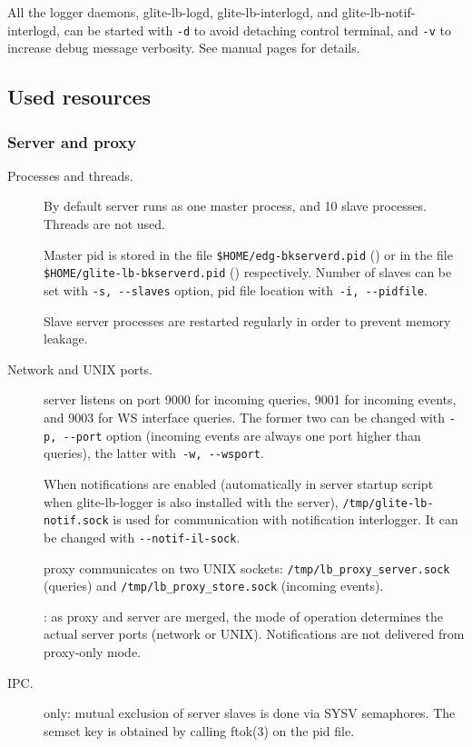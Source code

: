All the logger daemons, \ie glite-lb-logd, glite-lb-interlogd, and
glite-lb-notif-interlogd, can be started with \verb'-d' 
to avoid detaching control terminal, and \verb'-v' to increase 
debug message verbosity.
See manual pages for details.

\subsection{Used resources}
\label{run:resources}

\subsubsection{Server and proxy}

\begin{description}
\item[Processes and threads.]
By default \LB server runs as one master process,
and 10 slave processes.
Threads are not used.

Master pid is stored in the file \verb'$HOME/edg-bkserverd.pid' ()
or in the file \verb'$HOME/glite-lb-bkserverd.pid' () respectively.
Number of slaves can be set with \verb'-s, --slaves' option,
pid file location with~\verb'-i, --pidfile'.

Slave server processes are restarted regularly in order to prevent
memory leakage.

\item[Network and UNIX ports.]
\LB server listens on port 9000 for incoming queries,
9001 for incoming events, and 9003 for WS interface queries.
The former two can be changed with \verb'-p, --port' option
(incoming events are always one port higher than queries), 
the latter with~\verb'-w, --wsport'.

When \LB notifications are enabled (automatically in server startup script when 
glite-lb-logger is also installed with the server), 
\verb'/tmp/glite-lb-notif.sock' is used for communication with notification interlogger.
It can be changed with \verb'--notif-il-sock'.

\LB proxy communicates on two UNIX sockets:
\verb'/tmp/lb_proxy_server.sock' (queries) and 
\verb'/tmp/lb_proxy_store.sock' (incoming events).

: as proxy and server are merged, the mode of operation determines
the actual server ports (network or UNIX).
Notifications are not delivered from proxy-only mode.

\item[IPC.]  only: mutual exclusion of server slaves is done
via SYSV semaphores. The semset key is obtained by calling ftok(3) on 
the pid file.


\end{description}
